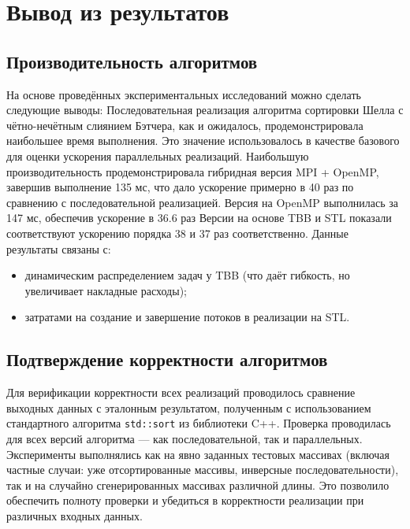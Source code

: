 \documentclass[a4paper,12pt]{article}
\begin{document}
\section{Вывод из результатов}

\subsection{Производительность алгоритмов}
На основе проведённых экспериментальных исследований можно сделать следующие выводы:
Последовательная реализация алгоритма сортировки Шелла с чётно-нечётным слиянием Бэтчера, как и ожидалось, продемонстрировала наибольшее время выполнения. Это значение использовалось в качестве базового для оценки ускорения параллельных реализаций.
Наибольшую производительность продемонстрировала гибридная версия MPI + OpenMP, завершив выполнение 135 мс, что дало ускорение примерно в 40 раз по сравнению с последовательной реализацией. Версия на OpenMP выполнилась за 147 мс, обеспечив ускорение в 36.6 раз
Версии на основе TBB и STL показали соответствуют ускорению порядка 38 и 37 раз соответственно. Данные результаты связаны с:

  \begin{itemize}
    \item динамическим распределением задач у TBB (что даёт гибкость, но увеличивает накладные расходы);
    \item затратами на создание и завершение потоков в реализации на STL.
  \end{itemize}

\subsection{Подтверждение корректности алгоритмов}
Для верификации корректности всех реализаций проводилось сравнение выходных данных с эталонным результатом, полученным с использованием стандартного алгоритма \texttt{std::sort} из библиотеки C++. Проверка проводилась для всех версий алгоритма — как последовательной, так и параллельных.
Эксперименты выполнялись как на явно заданных тестовых массивах (включая частные случаи: уже отсортированные массивы, инверсные последовательности), так и на случайно сгенерированных массивах различной длины. Это позволило обеспечить полноту проверки и убедиться в корректности реализации при различных входных данных.
\newpage
\end{document}
